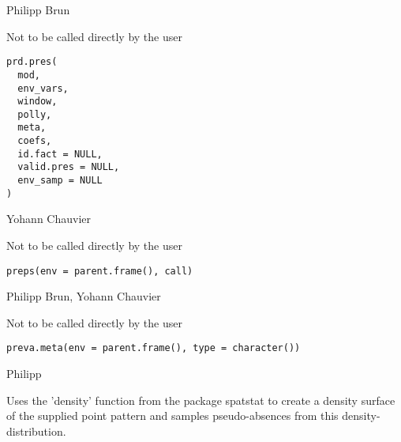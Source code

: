 \documentclass[a4paper]{book}
\begin{document}
%
\begin{Author}\relax
Philipp Brun
\end{Author}
%
\begin{Description}\relax
Not to be called directly by the user
\end{Description}
%
\begin{Usage}
\begin{verbatim}
prd.pres(
  mod,
  env_vars,
  window,
  polly,
  meta,
  coefs,
  id.fact = NULL,
  valid.pres = NULL,
  env_samp = NULL
)
\end{verbatim}
\end{Usage}
%
\begin{Author}\relax
Yohann Chauvier
\end{Author}
%
\begin{Description}\relax
Not to be called directly by the user
\end{Description}
%
\begin{Usage}
\begin{verbatim}
preps(env = parent.frame(), call)
\end{verbatim}
\end{Usage}
%
\begin{Author}\relax
Philipp Brun, Yohann Chauvier
\end{Author}
%
\begin{Description}\relax
Not to be called directly by the user
\end{Description}
%
\begin{Usage}
\begin{verbatim}
preva.meta(env = parent.frame(), type = character())
\end{verbatim}
\end{Usage}
%
\begin{Author}\relax
Philipp
\end{Author}
%
\begin{Description}\relax
Uses the 'density' function from the package spatstat to create a density
surface of the supplied point pattern and samples pseudo-absences from this
density-distribution.
\end{Description}
\end{document}
